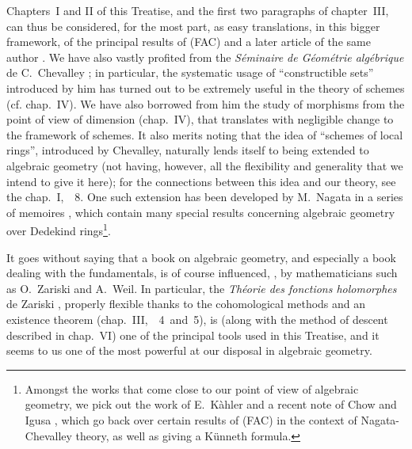 \documentclass{book}
\begin{document}
Chapters~I and II of this Treatise, and the first two paragraphs of chapter~III,
can thus be considered, for the most part, as easy translations, in this bigger
framework, of the principal results of (FAC) and a later article of the same
author \cite{15}. We have also vastly profited from the \emph{S{\'e}minaire de
G{\'e}om{\'e}trie alg{\'e}brique} de C.~Chevalley \cite{1}; in particular, the
systematic usage of ``constructible sets'' introduced by him has turned out to
be extremely useful in the theory of schemes (cf. chap.~IV). We have also
borrowed from him the study of morphisms from the point of view of
dimension (chap.~IV), that translates with negligible change to the framework of
schemes. It also merits noting that the idea of ``schemes of local rings'',
introduced by Chevalley, naturally lends itself to being extended to algebraic
geometry (not having, however, all the flexibility and generality that we intend
to give it here); for the connections between this idea and our theory, see the
chap.~I,~\textsection~8. One such extension has been developed by M.~Nagata in
a series of memoires \cite{9}, which contain many special results concerning
algebraic geometry over Dedekind rings\footnote{Amongst the works that come
close to our point of view of algebraic geometry, we pick out the work of
E.~K{\`a}hler \cite{22} and a recent note of Chow and Igusa \cite{3}, which go
back over certain results of (FAC) in the context of Nagata-Chevalley theory, as
well as giving a K{\"u}nneth formula.}.

\asttri

It goes without saying that a book on algebraic geometry, and especially a book
dealing with the fundamentals, is of course influenced, \completelyunsure, by
mathematicians such as O.~Zariski and A.~Weil. In particular, the
\emph{Th{\'e}orie des fonctions holomorphes} de Zariski \cite{20}, properly
flexible thanks to the cohomological methods and an existence theorem
(chap.~III,~\textsection\textsection~4~and~5), is (along with the method of
descent described in chap.~VI) one of the principal tools used in this Treatise,
and it seems to us one of the most powerful at our disposal in algebraic
geometry.
\end{document}

